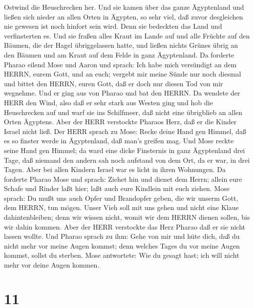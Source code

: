Ostwind die Heuschrecken her.  Und sie kamen über das ganze
Ägyptenland und ließen sich nieder an allen Orten in Ägypten, so sehr
viel, daß zuvor desgleichen nie gewesen ist noch hinfort sein wird.
 Denn sie bedeckten das Land und verfinsterten es. Und sie
fraßen alles Kraut im Lande auf und alle Früchte auf den Bäumen, die der
Hagel übriggelassen hatte, und ließen nichts Grünes übrig an den Bäumen
und am Kraut auf dem Felde in ganz Ägyptenland.  Da
forderte Pharao eilend Mose und Aaron und sprach: Ich habe mich
versündigt an dem HERRN, eurem Gott, und an euch;  vergebt
mir meine Sünde nur noch diesmal und bittet den HERRN, euren Gott, daß
er doch nur diesen Tod von mir wegnehme.  Und er ging aus
von Pharao und bat den HERRN.  Da wendete der HERR den
Wind, also daß er sehr stark aus Westen ging und hob die Heuschrecken
auf und warf sie ins Schilfmeer, daß nicht eine übrigblieb an allen
Orten Ägyptens.  Aber der HERR verstockte Pharaos Herz, daß
er die Kinder Israel nicht ließ.  Der HERR sprach zu Mose:
Recke deine Hand gen Himmel, daß es so finster werde in Ägyptenland, daß
man's greifen mag.  Und Mose reckte seine Hand gen Himmel;
da ward eine dicke Finsternis in ganz Ägyptenland drei Tage,
 daß niemand den andern sah noch aufstand von dem Ort, da
er war, in drei Tagen. Aber bei allen Kindern Israel war es licht in
ihren Wohnungen.  Da forderte Pharao Mose und sprach:
Ziehet hin und dienet dem Herrn; allein eure Schafe und Rinder laßt
hier; laßt auch eure Kindlein mit euch ziehen.  Mose
sprach: Du mußt uns auch Opfer und Brandopfer geben, die wir unserm
Gott, dem HERRN, tun mögen.  Unser Vieh soll mit uns gehen
und nicht eine Klaue dahintenbleiben; denn wir wissen nicht, womit wir
dem HERRN dienen sollen, bis wir dahin kommen.  Aber der
HERR verstockte das Herz Pharao daß er sie nicht lassen wollte.
 Und Pharao sprach zu ihm: Gehe von mir und hüte dich, daß
du nicht mehr vor meine Augen kommst; denn welches Tages du vor meine
Augen kommst, sollst du sterben.  Mose antwortete: Wie du
gesagt hast; ich will nicht mehr vor deine Augen kommen.

\hypertarget{section-10}{%
\section{11}\label{section-10}}

